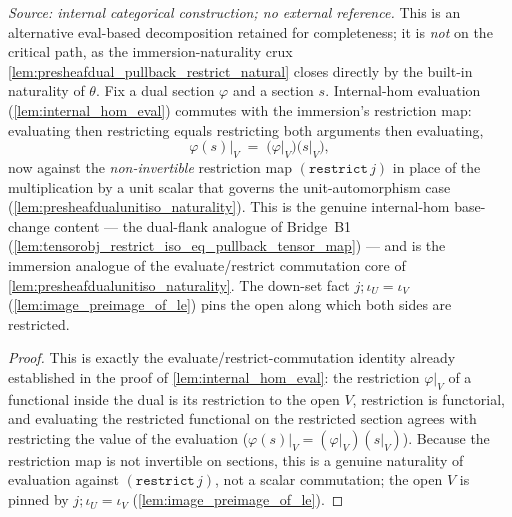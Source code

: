 \begin{lemma}

  \label{lem:presheafdual_eval_restrict_commute_apply}
  \textit{Source: internal categorical construction; no external reference.}
  This is an alternative eval-based decomposition retained for completeness; it is \emph{not} on the
  critical path, as the immersion-naturality crux \cref{lem:presheafdual_pullback_restrict_natural}
  closes directly by the built-in naturality of \(\theta\).
  Fix a dual section \(\varphi\) and a section \(s\). Internal-hom evaluation
  (\cref{lem:internal_hom_eval}) commutes with the immersion's restriction map: evaluating then
  restricting equals restricting both arguments then evaluating,
  \[
    \varphi(s)\big|_V \;=\; \bigl(\varphi\big|_V\bigr)\bigl(s\big|_V\bigr),
  \]
  now against the \emph{non-invertible} restriction map \((\mathtt{restrict}\,j)\) in place of the
  multiplication by a unit scalar that governs the unit-automorphism case
  (\cref{lem:presheafdualunitiso_naturality}). This is the genuine internal-hom base-change content ---
  the dual-flank analogue of Bridge~B1 (\cref{lem:tensorobj_restrict_iso_eq_pullback_tensor_map}) ---
  and is the immersion analogue of the evaluate/restrict commutation core of
  \cref{lem:presheafdualunitiso_naturality}. The
  down-set fact \(j \mathbin{;} \iota_U = \iota_V\) (\cref{lem:image_preimage_of_le}) pins the open
  along which both sides are restricted.
\end{lemma}
\begin{proof}
  \leanok
  This is exactly the evaluate/restrict-commutation identity already established in the proof of
  \cref{lem:internal_hom_eval}: the restriction \(\varphi|_V\) of a functional inside the dual is its
  restriction to the open \(V\), restriction is functorial, and evaluating the restricted functional
  on the restricted section agrees with restricting the value of the evaluation
  (\(\varphi(s)|_V = (\varphi|_V)(s|_V)\)). Because the restriction map is not invertible on sections,
  this is a genuine naturality of evaluation against \((\mathtt{restrict}\,j)\), not a scalar
  commutation; the open \(V\) is pinned by \(j \mathbin{;} \iota_U = \iota_V\)
  (\cref{lem:image_preimage_of_le}).
\end{proof}

